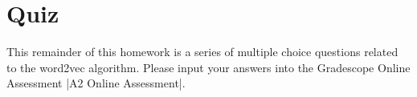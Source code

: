 \section{Quiz}

This remainder of this homework is a series of multiple choice questions related to the word2vec algorithm. Please input your answers into the Gradescope Online Assessment |A2 Online Assessment|.






